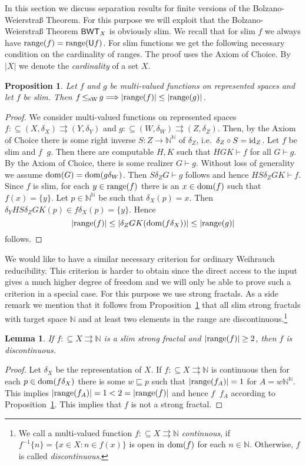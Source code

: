 \documentclass[a4paper]{amsart}
\def\IN{{\mathbb{N}}}
\def\TO{\Longrightarrow}
\def\In{\subseteq}
\def\prefix{\sqsubseteq}
\def\mto{\rightrightarrows}
\def\id{{\rm id}}
\def\dom{{\rm dom}}
\def\range{{\rm range}}
\def\Baire{{\IN^\IN}}
\def\BWT{\text{\rm\sffamily BWT}}
\def\U{\text{\rm\sffamily U}}
\def\leqSW{\mathop{\leq_{\mathrm{sW}}}}
\def\nleqSW{\mathop{\not\leq_{\mathrm{sW}}}}
\newtheorem{proposition}[theorem]{Proposition}
\newtheorem{lemma}[theorem]{Lemma}
\theoremstyle{definition}
\begin{document}
In this section we discuss separation results for finite versions of the Bolzano-Weierstra\ss{} Theorem.
For this purpose we will exploit that the Bolzano-Weierstra\ss{} Theorem $\BWT_X$ is obviously slim.
We recall that for slim $f$ we always have $\range(f)=\range(\U f)$.
For slim functions we get the following necessary condition on the cardinality of ranges.
The proof uses the Axiom of Choice. 
By $|X|$ we denote the {\em cardinality} of a set $X$.

\begin{proposition}
\label{prop:cardinality-slim}
Let $f$ and $g$ be multi-valued functions on represented spaces
and let $f$ be slim. Then 
$f\leqSW g\TO|\range(f)|\leq|\range(g)|$.
\end{proposition}
\begin{proof}
We consider multi-valued functions on represented spaces
$f:\In(X,\delta_X)\mto(Y,\delta_Y)$ and $g:\In(W,\delta_W)\mto(Z,\delta_Z)$. 
Then, by the Axiom of Choice there is some right inverse $S:Z\to\Baire$ of $\delta_Z$,
i.e.\ $\delta_Z\circ S=\id_Z$.
Let $f$ be slim and $f\leqSW g$. Then there are computable $H,K$
such that $HGK\vdash f$ for all $G\vdash g$.
By the Axiom of Choice, there is some realizer $G\vdash g$. Without loss of generality
we assume $\dom(G)=\dom(g\delta_W)$.
Then $S\delta_ZG\vdash g$ follows and hence
$HS\delta_ZGK\vdash f$. Since $f$ is slim, for each $y\in\range(f)$ there is an $x\in\dom(f)$ 
such that $f(x)=\{y\}$. Let $p\in\Baire$ be such that $\delta_X(p)=x$. 
Then $\delta_YHS\delta_ZGK(p)\in f\delta_X(p)=\{y\}$. Hence 
\[|\range(f)|\leq|\delta_ZGK(\dom(f\delta_X))|\leq|\range(g)|\]
follows.
\end{proof}

We would like to have a similar necessary criterion for ordinary 
Weihrauch reducibility. This criterion is harder to obtain since
the direct access to the input gives a much higher degree of freedom
and we will only be able to prove such a criterion in a special case.
For this purpose we use strong fractals.
As a side remark we mention that it follows from Proposition~\ref{prop:cardinality-slim}
that all slim strong fractals with target space $\IN$ and at least two elements in the range are discontinuous.\footnote{We
call a multi-valued function $f:\In X\mto\IN$ {\em continuous}, if $f^{-1}\{n\}=\{x\in X:n\in f(x)\}$
is open in $\dom(f)$ for each $n\in\IN$. Otherwise, $f$ is called {\em discontinuous}.}

\begin{lemma}
If $f:\In X\mto\IN$ is a slim strong fractal and $|\range(f)|\geq 2$, then $f$ is discontinuous.
\end{lemma}
\begin{proof}
Let $\delta_X$ be the representation of $X$.
If $f:\In X\mto\IN$ is continuous then for each $p\in\dom(f\delta_X)$ there is some $w\prefix p$
such that $|\range(f_A)|=1$ for $A=w\IN^\IN$. This implies $|\range(f_A)|=1<2=|\range(f)|$ and
hence $f\nleqSW f_A$ according to Proposition~\ref{prop:cardinality-slim}.
This implies that $f$ is not a strong fractal.
\end{proof}
\end{document}
